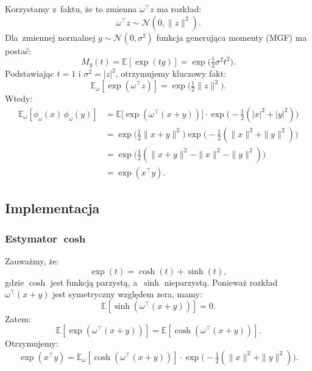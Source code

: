 \documentclass[a4paper,11pt,twoside]{report}
\makeatletter
\theoremstyle{definition}
\renewenvironment{proof}[1][\proofname]
{\par
  \vspace{-12pt}%
  \pushQED{\qed}%
  \normalfont
  \topsep0pt \partopsep0pt %
  \trivlist
  \item[\hskip\labelsep
        \sc
    #1\@addpunct{:}]\ignorespaces
}
{%
  \popQED\endtrivlist\@endpefalse
  \addvspace{20pt} %
}
\makeatother
\begin{document}
\begin{proof}
Korzystamy z~faktu, że to zmienna $\omega^\top z$ ma rozkład:
\begin{equation}
\omega^\top z \sim \mathcal N(0, \|z\|^2).
\end{equation}
Dla~zmiennej normalnej $g \sim \mathcal N(0, \sigma^2)$ funkcja generująca momenty (MGF) ma postać:
\begin{equation}
M_g(t)=\mathbb{E}[\exp(tg)] = \exp\Big(\tfrac12\sigma^2 t^2\Big).
\end{equation}
Podstawiając $t = 1$ i $\sigma^2 = |z|^2$, otrzymujemy kluczowy fakt:
\begin{equation}
\mathbb{E}_{\omega}[\exp(\omega^\top z)]= \exp\Big(\tfrac12\|z\|^2\Big).
\end{equation}
Wtedy:
\begin{equation}
\begin{aligned}
\mathbb{E}_{\omega}\!\left[\phi_\omega(x)\,\phi_\omega(y)\right]&=\mathbb{E}\big[\exp(\omega^\top (x+y))\big]\cdot \exp\Big(-\tfrac12(|x|^2+|y|^2)\Big)\\
&=\exp\Big(\tfrac12\|x+y\|^2\Big)\exp\Big(-\tfrac12(\|x\|^2+\|y\|^2)\Big)\\
&=\exp\Big(\tfrac12(\|x+y\|^2 - \|x\|^2 - \|y\|^2)\Big)\\
&= \exp(x^\top y).
\end{aligned}
\end{equation}
\end{proof}

\subsection{Implementacja}


\subsubsection{Estymator $\boldsymbol{\cosh}$}
Zauważmy, że:
\begin{equation}
\exp(t)=\cosh(t)+\sinh(t),
\end{equation}
gdzie $\cosh$ jest funkcją parzystą, a~$\sinh$ nieparzystą. Ponieważ rozkład $\omega^\top(x+y)$ jest symetryczny względem zera, mamy:
\begin{equation}
\mathbb{E}[\sinh(\omega^\top(x+y))] = 0.
\end{equation}
Zatem:
\begin{equation}
\mathbb{E}[\exp(\omega^\top (x+y))]= \mathbb{E}[\cosh(\omega^\top(x+y))].
\end{equation}
Otrzymujemy:
\begin{equation}
\exp(x^\top y)= \mathbb{E}_{\omega}\left[\cosh(\omega^\top(x+y))\right]\cdot\exp\Big(-\tfrac12(\|x\|^2+\|y\|^2)\Big).
\end{equation}
\end{document}
